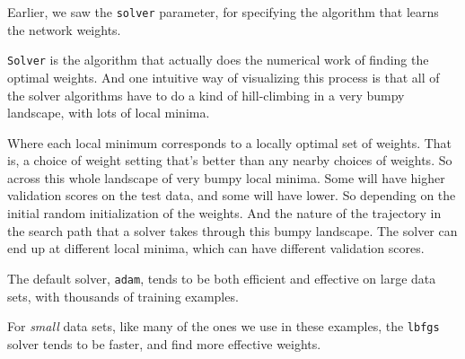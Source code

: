 \begin{multicols}{2}
Earlier, we saw the \texttt{solver} parameter, for specifying the algorithm that learns the network weights. 

\texttt{Solver} is the algorithm that actually does the numerical work of finding the optimal weights. And one intuitive way of visualizing this  process is that all of the solver algorithms have to do a kind of hill-climbing in a very bumpy landscape, with lots of local minima. 

Where each local minimum corresponds to a locally optimal set of weights. That is, a choice of weight setting that's better than any nearby choices of weights. So across this whole landscape of very bumpy local minima. Some will have higher validation scores on the test data, and some will have lower. So depending on the initial random initialization of the weights. And the nature of the trajectory in the search path that a solver takes through this bumpy landscape. The solver can end up at different local minima, which can have different validation scores. 

The default solver, \texttt{adam}, tends to be both efficient and effective on large data sets, with thousands of training examples. 

For \emph{small} data sets, like many of the ones we use in these examples, the \texttt{lbfgs} solver tends to be faster, and find more effective weights.
\end{multicols}